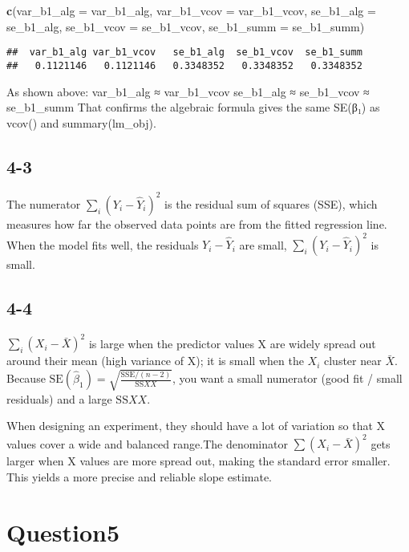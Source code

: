 \documentclass[
]{article}
\newenvironment{Shaded}{\begin{snugshade}}{\end{snugshade}}
\newcommand{\AttributeTok}[1]{\textcolor[rgb]{0.13,0.29,0.53}{#1}}
\newcommand{\FunctionTok}[1]{\textcolor[rgb]{0.13,0.29,0.53}{\textbf{#1}}}
\newcommand{\NormalTok}[1]{#1}
\begin{document}
\begin{Shaded}
\begin{Highlighting}[]
\FunctionTok{c}\NormalTok{(}\AttributeTok{var\_b1\_alg =}\NormalTok{ var\_b1\_alg,}
  \AttributeTok{var\_b1\_vcov =}\NormalTok{ var\_b1\_vcov,}
  \AttributeTok{se\_b1\_alg   =}\NormalTok{ se\_b1\_alg,}
  \AttributeTok{se\_b1\_vcov  =}\NormalTok{ se\_b1\_vcov,}
  \AttributeTok{se\_b1\_summ  =}\NormalTok{ se\_b1\_summ)}
\end{Highlighting}
\end{Shaded}

\begin{verbatim}
##  var_b1_alg var_b1_vcov   se_b1_alg  se_b1_vcov  se_b1_summ 
##   0.1121146   0.1121146   0.3348352   0.3348352   0.3348352
\end{verbatim}

As shown above: var\_b1\_alg ≈ var\_b1\_vcov se\_b1\_alg ≈ se\_b1\_vcov
≈ se\_b1\_summ That confirms the algebraic formula gives the same SE(β₁)
as vcov() and summary(lm\_obj).

\subsection{4-3}\label{section-20}

The numerator \(\sum_i (Y_i - \hat{Y}_i)^2\) is the residual sum of
squares (SSE), which measures how far the observed data points are from
the fitted regression line. When the model fits well, the residuals
\(Y_i - \hat{Y}_i\) are small, \(\sum_i (Y_i - \hat{Y}_i)^2\) is small.

\subsection{4-4}\label{section-21}

\(\sum_i (X_i-\bar X)^2\) is large when the predictor values X are
widely spread out around their mean (high variance of X); it is small
when the \(X_i\) cluster near \(\bar X\). Because
\(\mathrm{SE}(\hat\beta_1)=\sqrt{\frac{\mathrm{SSE}/(n-2)}{\mathrm{SS}{XX}}}\),
you want a small numerator (good fit / small residuals) and a large
\(\mathrm{SS}{XX}\).

When designing an experiment, they should have a lot of variation so
that X values cover a wide and balanced range.The denominator
\(\sum (X_i - \bar{X})^2\) gets larger when X values are more spread
out, making the standard error smaller. This yields a more precise and
reliable slope estimate.

\section{Question5}\label{question5}
\end{document}
